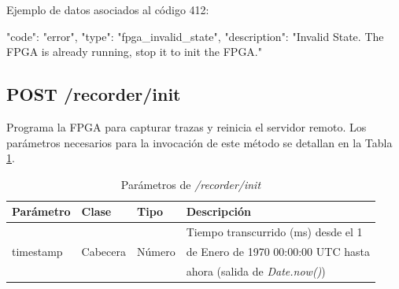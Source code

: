 \begin{itemize}
{\begin{minipage}{\textwidth}
Ejemplo de datos asociados al código 412:

\begin{code}[language=json]
{
  "code": "error",
  "type": "fpga_invalid_state",
  "description": "Invalid State. The FPGA is already running, stop it to init the FPGA."
}
\end{code}
\end{minipage}
}

\end{itemize}

%
%
\subsection{POST /recorder/init}

Programa la \gls{FPGA} para capturar \glspl{traza} y reinicia el servidor remoto. Los parámetros necesarios para la invocación de este método se detallan en la Tabla \ref{extra:api:recorderinit:invocacion}.

\begin{table}[H]
\centering
\begin{tabular}{|l|l|l|l|}
\hline
\rowcolor[HTML]{F5F5F5}
\textbf{Parámetro}  & \textbf{Clase} & \textbf{Tipo} & \textbf{Descripción}                  \\ \hline
                    &                &               & Tiempo transcurrido (ms) desde el 1   \\
timestamp           & Cabecera       & Número        & de Enero de 1970 00:00:00 UTC hasta   \\
                    &                &               & ahora (salida de \textit{Date.now()}) \\ \hline
\end{tabular}
\caption{Parámetros de \textit{/recorder/init}}
\label{extra:api:recorderinit:invocacion}
\end{table}

